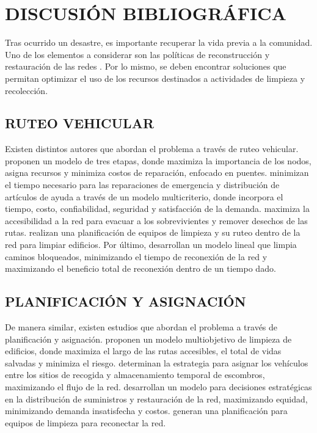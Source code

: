 \documentclass[12pt,a4paper]{article}
\begin{document}

\section{DISCUSIÓN BIBLIOGRÁFICA}

Tras ocurrido un desastre, es importante recuperar la vida previa a la comunidad. Uno de los elementos a considerar son las políticas de reconstrucción y restauración de las redes \citet{Feng2003}. Por lo mismo, se deben encontrar soluciones que permitan optimizar el uso de los recursos destinados a actividades de limpieza y recolección.

\subsection{RUTEO VEHICULAR}

Existen distintos autores que abordan el problema a través de ruteo vehicular. \citet{Karlaftis2007} proponen un modelo de tres etapas, donde maximiza la importancia de los nodos, asigna recursos y minimiza costos de reparación, enfocado en puentes. \citet{Liberatore2014} minimizan el tiempo necesario para las reparaciones de emergencia y distribución de artículos de ayuda a través de un modelo multicriterio, donde incorpora el tiempo, costo, confiabilidad, seguridad y satisfacción de la demanda. \citet{Aksu2014} maximiza la accesibilidad a la red para evacuar a los sobrevivientes y remover desechos de las rutas. \citet{MayaDuque2016} realizan una planificación de equipos de limpieza y su ruteo dentro de la red para limpiar edificios. Por último, \citet{Kasaei2016} desarrollan un modelo lineal que limpia caminos bloqueados, minimizando el tiempo de reconexión de la red y maximizando el beneficio total de reconexión dentro de un tiempo dado.

\subsection{PLANIFICACIÓN Y ASIGNACIÓN}

De manera similar, existen estudios que abordan el problema a través de planificación y asignación. \citet{Feng2003} proponen un modelo multiobjetivo de limpieza de edificios, donde maximiza el largo de las rutas accesibles, el total de vidas salvadas y minimiza el riesgo. \citet{Brooks2013} determinan la estrategia para asignar los vehículos entre los sitios de recogida y almacenamiento temporal de escombros, maximizando el flujo de la red. \citet{Ransikarbum2016} desarrollan un modelo para decisiones estratégicas en la distribución de suministros y restauración de la red, maximizando equidad, minimizando demanda insatisfecha y costos. \citet{Akbari2017} generan una planificación para equipos de limpieza para reconectar la red.
\end{document}
